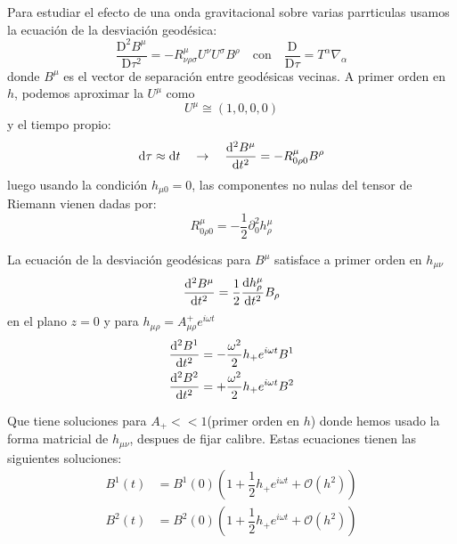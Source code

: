 \documentclass[../main]{subfiles}
\begin{document}
Para estudiar el efecto de una onda gravitacional sobre varias parrticulas usamos la ecuación de la desviación geodésica:
\begin{equation}
    \dfrac{\mathrm{D}^2 B^{\mu}}{\mathrm{D}\tau^2}=-R^{\mu}_{\nu\rho\sigma}U^{\nu}U^{\sigma}B^{\rho} \quad \text{con} \quad \dfrac{\mathrm{D}}{\mathrm{D}\tau}=T^{\alpha}\nabla_{\alpha}
\end{equation}
donde $B^{\mu}$ es el vector de separación entre geodésicas vecinas. A primer orden en $h$, podemos aproximar la $U^{\mu}$ como 
\begin{equation}
    U^{\mu} \cong (1, 0, 0, 0)
\end{equation}
y el tiempo propio:
\begin{equation}
    \mathrm{d}\tau\approx \mathrm{d}t \quad \rightarrow \quad \dv{^2 B^{\mu}}{t^2}=-R^{\mu}_{0\rho 0}B^{\rho}
\end{equation}
luego usando la condición $h_{\mu 0}=0$, las componentes no nulas del tensor de Riemann vienen dadas por:
\begin{equation}
    R^{\mu}_{0\rho 0}=-\dfrac{1}{2}\partial^2_0 h^{\mu}_{\rho}
\end{equation}

La ecuación de la desviación geodésicas para $B^{\mu}$ satisface a primer orden en $h_{\mu\nu}$ 
\begin{equation}
    \dv{^2 B^{\mu}}{t^2}=\dfrac{1}{2}\dv{h^{\mu}_{\rho}}{t^2}B_{\rho}
\end{equation}
en el plano $z=0$ y para $h_{\mu\rho}=A^+_{\mu\rho}e^{i\omega t}$ 
\begin{equation}
    \begin{split}
        \dv{^2 B^1}{t^2}&=-\dfrac{\omega^2}{2}h_+ e^{i \omega t}B^1 \\ 
        \dv{^2 B^2}{t^2}&=+\dfrac{\omega^2}{2}h_+ e^{i \omega t}B^2
    \end{split}
\end{equation}

Que tiene soluciones para $A_+ << 1$(primer orden en $h$) donde hemos usado la forma matricial de $h_{\mu\nu}$, despues de fijar calibre. Estas ecuaciones tienen las siguientes soluciones:
\begin{equation}
    \begin{split}
        B^1(t)&=B^1(0)\left(1+\dfrac{1}{2}h_+ e^{i\omega t}+\mathcal{O}(h^2)\right)\\
        B^2(t)&=B^2(0)\left(1+\dfrac{1}{2}h_+ e^{i\omega t}+\mathcal{O}(h^2)\right)
    \end{split}
\end{equation}
\end{document}
